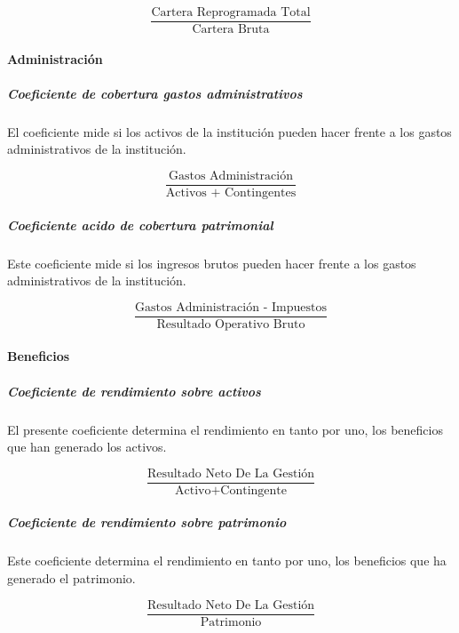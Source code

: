 \documentclass[
  12pt,
]{article}
\begin{document}
\[ \frac{ \text{Cartera Reprogramada Total} }{ \text{Cartera Bruta} } \]

\hypertarget{administraciuxf3n}{%
\paragraph{Administración}\label{administraciuxf3n}}

\hypertarget{coeficiente-de-cobertura-gastos-administrativos}{%
\subparagraph{Coeficiente de cobertura gastos
administrativos}\label{coeficiente-de-cobertura-gastos-administrativos}}

El coeficiente mide si los activos de la institución pueden hacer frente
a los gastos administrativos de la institución.

\[ \frac{ \text{Gastos Administración} }{ \text{Activos + Contingentes} } \]

\hypertarget{coeficiente-acido-de-cobertura-patrimonial}{%
\subparagraph{Coeficiente acido de cobertura
patrimonial}\label{coeficiente-acido-de-cobertura-patrimonial}}

Este coeficiente mide si los ingresos brutos pueden hacer frente a los
gastos administrativos de la institución.

\[ \frac{ \text{Gastos Administración - Impuestos} }{ \text{Resultado Operativo Bruto} } \]

\hypertarget{beneficios}{%
\paragraph{Beneficios}\label{beneficios}}

\hypertarget{coeficiente-de-rendimiento-sobre-activos}{%
\subparagraph{Coeficiente de rendimiento sobre
activos}\label{coeficiente-de-rendimiento-sobre-activos}}

El presente coeficiente determina el rendimiento en tanto por uno, los
beneficios que han generado los activos.

\[ \frac{ \text{Resultado Neto De La Gestión} }{ \text{Activo+Contingente} } \]

\hypertarget{coeficiente-de-rendimiento-sobre-patrimonio}{%
\subparagraph{Coeficiente de rendimiento sobre
patrimonio}\label{coeficiente-de-rendimiento-sobre-patrimonio}}

Este coeficiente determina el rendimiento en tanto por uno, los
beneficios que ha generado el patrimonio.

\[ \frac{ \text{Resultado Neto De La Gestión} }{ \text{Patrimonio} } \]
\end{document}
